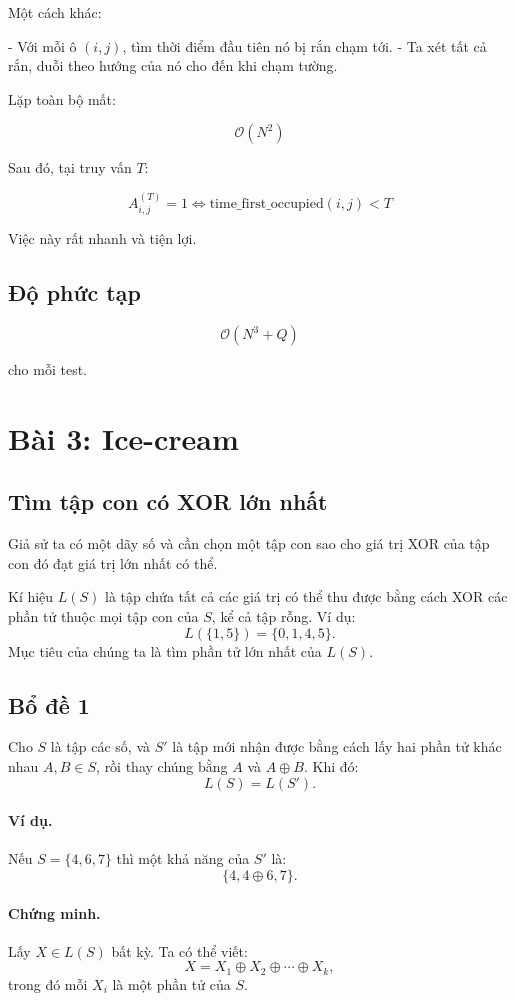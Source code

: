 Một cách khác:

- Với mỗi ô $(i,j)$, tìm thời điểm đầu tiên nó bị rắn chạm tới.
- Ta xét tất cả rắn, duỗi theo hướng của nó cho đến khi chạm tường.

Lặp toàn bộ mất:

\[
\mathcal{O}(N^2)
\]

Sau đó, tại truy vấn $T$:

\[
A_{i,j}^{(T)} = 1 \iff \text{time\_first\_occupied}(i,j) < T
\]

Việc này rất nhanh và tiện lợi.

\subsection*{Độ phức tạp}

\[
\boxed{
\mathcal{O}(N^3 + Q)
}
\]

cho mỗi test.

\newpage

\section*{Bài 3: Ice-cream}

\subsection*{Tìm tập con có XOR lớn nhất}

Giả sử ta có một dãy số và cần chọn một tập con sao cho giá trị XOR của tập con đó đạt giá trị lớn nhất có thể.

Kí hiệu $L(S)$ là tập chứa tất cả các giá trị có thể thu được bằng cách XOR các phần tử thuộc mọi tập con của $S$, kể cả tập rỗng.  
Ví dụ:
\[
L(\{1,5\}) = \{0, 1, 4, 5\}.
\]
Mục tiêu của chúng ta là tìm phần tử lớn nhất của $L(S)$.

\subsection*{Bổ đề 1}
Cho $S$ là tập các số, và $S'$ là tập mới nhận được bằng cách lấy hai phần tử khác nhau $A, B \in S$, rồi thay chúng bằng $A$ và $A \oplus B$. Khi đó:
\[
L(S) = L(S').
\]

\paragraph{Ví dụ.}  
Nếu $S=\{4,6,7\}$ thì một khả năng của $S'$ là:
\[
\{4, 4\oplus 6, 7\}.
\]

\paragraph{Chứng minh.}  
Lấy $X \in L(S)$ bất kỳ. Ta có thể viết:
\[
X = X_1 \oplus X_2 \oplus \cdots \oplus X_k,
\]
trong đó mỗi $X_i$ là một phần tử của $S$.

